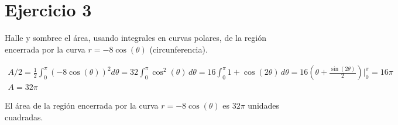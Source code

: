 \section*{Ejercicio 3}
\noindent Halle y sombree el área, usando integrales en curvas polares, de la región encerrada por la curva \(r = -8\cos(\theta)\) (circunferencia).

\begin{gather*}
  A / 2 = \frac{1}{2} \int_{0}^{\pi} \left(-8\cos(\theta)\right)^2 d\theta %
    = 32 \int_{0}^{\pi} \cos^2(\theta) \, d\theta %
    = 16 \int_{0}^{\pi} 1 + \cos(2\theta) \, d\theta %
    = 16 \left(\theta + \frac{\sin(2\theta)}{2}\right)\bigg|_{0}^{\pi} %
    = 16 \pi \\
  A = 32 \pi
\end{gather*}

\noindent El área de la región encerrada por la curva \(r = -8\cos(\theta)\) es \(32 \pi\) unidades cuadradas.

\vspace{5cm}